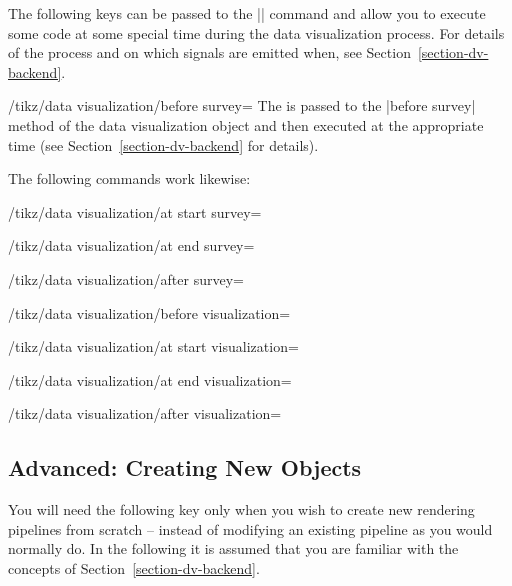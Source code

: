 The following keys can be passed to the |\datavisualization| command
and allow you to execute some code at some special time during the
data visualization process. For details of the process and on which
signals are emitted when,
see Section~\ref{section-dv-backend}.

\begin{key}{/tikz/data visualization/before survey=}
  The  is passed to the |before survey| method of the data
  visualization object and then executed at the appropriate time (see
  Section~\ref{section-dv-backend} for details).

  The following commands work likewise:
\end{key}
\begin{key}{/tikz/data visualization/at start survey=}
\end{key}
\begin{key}{/tikz/data visualization/at end survey=}
\end{key}
\begin{key}{/tikz/data visualization/after survey=}
\end{key}
\begin{key}{/tikz/data visualization/before visualization=}
\end{key}
\begin{key}{/tikz/data visualization/at start visualization=}
\end{key}
\begin{key}{/tikz/data visualization/at end visualization=}
\end{key}
\begin{key}{/tikz/data visualization/after visualization=}
\end{key}



\subsection{Advanced: Creating New Objects}

You will need the following key only when you wish to create new
rendering pipelines from scratch -- instead of modifying an existing
pipeline as you would normally do. In the following it is assumed that
you are familiar with the concepts of Section~\ref{section-dv-backend}.


